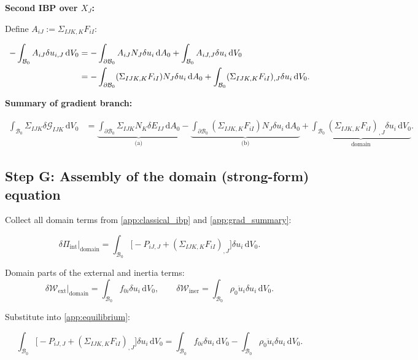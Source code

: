 \documentclass[11pt]{article}
\begin{document}
\textbf{Second IBP over $X_J$:}

Define $A_{iJ}:=\Sigma_{IJK,K}F_{iI}$:

\begin{align}
-\int_{\mathcal{B}_0}A_{iJ}\delta u_{i,J}\,\mathrm{d}V_0
&= -\int_{\partial\mathcal{B}_0}A_{iJ}N_J\delta u_i\,\mathrm{d}A_0
   + \int_{\mathcal{B}_0}A_{iJ,J}\delta u_i\,\mathrm{d}V_0 \notag\\
&= -\int_{\partial\mathcal{B}_0}(\Sigma_{IJK,K}F_{iI})N_J\delta u_i\,\mathrm{d}A_0
   + \int_{\mathcal{B}_0}(\Sigma_{IJK,K}F_{iI})_{,J}\delta u_i\,\mathrm{d}V_0.
\label{app:grad_ibp2}
\end{align}

\textbf{Summary of gradient branch:}

\begin{align}
\int_{\mathcal{B}_0}\Sigma_{IJK}\delta\mathcal{G}_{IJK}\,\mathrm{d}V_0
&= \underbrace{\int_{\partial\mathcal{B}_0}\Sigma_{IJK}N_K\delta E_{IJ}\,\mathrm{d}A_0}_{\text{(a)}}
   - \underbrace{\int_{\partial\mathcal{B}_0}(\Sigma_{IJK,K}F_{iI})N_J\delta u_i\,\mathrm{d}A_0}_{\text{(b)}}
   + \underbrace{\int_{\mathcal{B}_0}(\Sigma_{IJK,K}F_{iI})_{,J}\delta u_i\,\mathrm{d}V_0}_{\text{domain}}.
\label{app:grad_summary}
\end{align}

\subsection{Step G: Assembly of the domain (strong-form) equation}

Collect all domain terms from \eqref{app:classical_ibp} and \eqref{app:grad_summary}:

\begin{equation}
\delta\Pi_{\mathrm{int}}\big|_{\mathrm{domain}}
= \int_{\mathcal{B}_0}\bigl[-P_{iJ,J}+(\Sigma_{IJK,K}F_{iI})_{,J}\bigr]\delta u_i\,\mathrm{d}V_0.
\end{equation}

Domain parts of the external and inertia terms:
\begin{equation}
\delta\mathcal{W}_{\mathrm{ext}}\big|_{\mathrm{domain}} = \int_{\mathcal{B}_0}f_{0i}\delta u_i\,\mathrm{d}V_0,
\qquad
\delta\mathcal{W}_{\mathrm{iner}} = \int_{\mathcal{B}_0}\rho_0\ddot{u}_i\delta u_i\,\mathrm{d}V_0.
\end{equation}

Substitute into \eqref{app:equilibrium}:

\begin{equation}
\int_{\mathcal{B}_0}\bigl[-P_{iJ,J}+(\Sigma_{IJK,K}F_{iI})_{,J}\bigr]\delta u_i\,\mathrm{d}V_0
= \int_{\mathcal{B}_0}f_{0i}\delta u_i\,\mathrm{d}V_0
  - \int_{\mathcal{B}_0}\rho_0\ddot{u}_i\delta u_i\,\mathrm{d}V_0.
\end{equation}
\end{document}
